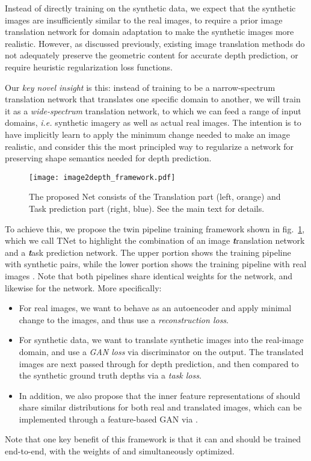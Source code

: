 \documentclass[runningheads]{llncs}
\def\ie{\emph{i.e.}\xspace}
\begin{document}
Instead of directly training  on the synthetic  data, we expect that the synthetic images are insufficiently similar to the real images, to require a prior image translation network  for domain adaptation to make the synthetic images more realistic.  However, as discussed previously, existing image translation methods do not adequately preserve the geometric content for accurate depth prediction, or require heuristic regularization loss functions.

Our \emph{key novel insight} is this: instead of training  to be a narrow-spectrum translation network that translates one specific domain to another, we will train it as a \emph{wide-spectrum} translation network, to which we can feed a range of input domains, \ie synthetic imagery as well as actual real images. The intention is to have  implicitly learn to apply the minimum change needed to make an image realistic, and consider this the most principled way to regularize a network for preserving shape semantics needed for depth prediction.

\begin{figure}[tb!]
	\centering
	\texttt{[image: image2depth\_framework.pdf]}
	\caption{The proposed Net consists of the Translation part (left, orange) and Task prediction part (right, blue). See the main text for details.}
	\label{fig:framework}
\end{figure}

To achieve this, we propose the twin pipeline training framework shown in fig.~\ref{fig:framework}, which we call TNet to highlight the combination of an image \emph{\textbf{t}}ranslation network and a \emph{\textbf{t}}ask prediction network. The upper portion shows the training pipeline with synthetic  pairs, while the lower portion shows the training pipeline with real images . Note that both pipelines share identical weights for the  network, and likewise for the  network. More specifically:
\begin{itemize}
	\item For real images, we want  to behave as an autoencoder and apply minimal change to the images, and thus use a \emph{reconstruction loss}.
	\item For synthetic data, we want  to translate synthetic images into the real-image domain, and use a \emph{GAN loss} via discriminator  on the output. The translated images are next passed through  for depth prediction, and then compared to the synthetic ground truth depths  via a \emph{task loss}.
	\item In addition, we also propose that the inner feature representations of  should share similar distributions for both real and translated images, which can be implemented through a feature-based GAN via . 
\end{itemize}
Note that one key benefit of this framework is that it can and should be trained end-to-end, with the weights of  and  simultaneously optimized.
\end{document}
